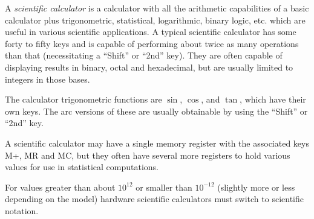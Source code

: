 \documentclass[12pt]{article}
\begin{document}
A {\em scientific calculator} is a calculator with all the arithmetic capabilities of a basic calculator plus trigonometric, statistical, logarithmic, binary logic, etc. which are useful in various scientific applications. A typical scientific calculator has some forty to fifty keys and is capable of performing about twice as many operations than that (necessitating a ``Shift'' or ``2nd'' key). They are often capable of displaying results in binary, octal and hexadecimal, but are usually limited to integers in those bases.

The calculator trigonometric functions are $\sin$, $\cos$, and $\tan$, which have their own keys. The arc versions of these are usually obtainable by using the ``Shift'' or ``2nd'' key.

A scientific calculator may have a single memory register with the associated keys M+, MR and MC, but they often have several more registers to hold various values for use in statistical computations.

For values greater than about $10^{12}$ or smaller than $10^{-12}$ (slightly more or less depending on the model) hardware scientific calculators must switch to scientific notation.
\end{document}
